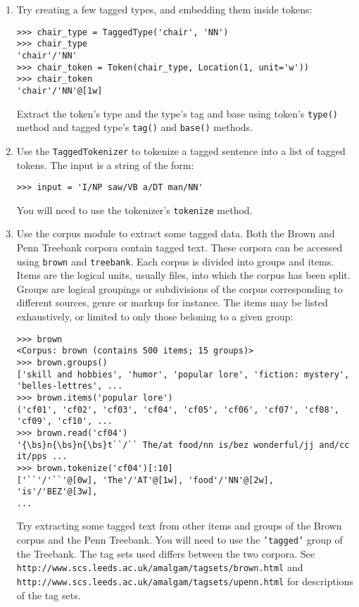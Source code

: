 \documentclass{worksheet}
\begin{document}
\begin{enumerate}
\item Try creating a few tagged types, and embedding them inside tokens:
\begin{verbatim}
>>> chair_type = TaggedType('chair', 'NN') 
>>> chair_type 
'chair'/'NN' 
>>> chair_token = Token(chair_type, Location(1, unit='w')) 
>>> chair_token 
'chair'/'NN'@[1w]
\end{verbatim}
Extract the token's type and the type's tag and base using token's 
\texttt{type()} method and tagged type's \texttt{tag()} and
\texttt{base()} methods.


\item Use the \texttt{TaggedTokenizer} to tokenize a tagged sentence into a
list of tagged tokens. The input is a string of the form:
\begin{verbatim}
>>> input = 'I/NP saw/VB a/DT man/NN'
\end{verbatim}
You will need to use the tokenizer's \texttt{tokenize} method.


\item Use the corpus module to extract some tagged data. Both the Brown and
Penn Treebank corpora contain tagged text. These corpora can be accessed
using \texttt{brown} and \texttt{treebank}. Each corpus is divided into
groups and items. Items are the logical units, usually files, into which
the corpus has been split. Groups are logical groupings or subdivisions of
the corpus corresponding to different sources, genre or markup for
instance. The items may be listed exhaustively, or limited to only those
beloning to a given group:
\begin{verbatim}
>>> brown 
<Corpus: brown (contains 500 items; 15 groups)> 
>>> brown.groups() 
['skill and hobbies', 'humor', 'popular lore', 'fiction: mystery',
'belles-lettres', ... 
>>> brown.items('popular lore') 
('cf01', 'cf02', 'cf03', 'cf04', 'cf05', 'cf06', 'cf07', 'cf08',
'cf09', 'cf10', ... 
>>> brown.read('cf04') 
'{\bs}n{\bs}n{\bs}t``/`` The/at food/nn is/bez wonderful/jj and/cc
it/pps ... 
>>> brown.tokenize('cf04')[:10] 
['``'/'``'@[0w], 'The'/'AT'@[1w], 'food'/'NN'@[2w], 'is'/'BEZ'@[3w],
...
\end{verbatim}
Try extracting some tagged text from other items and groups of the Brown
corpus and the Penn Treebank. You will need to use the \texttt{'tagged'}
group of the Treebank. The tag sets used differs between the two
corpora. See
\texttt{http://www.scs.leeds.ac.uk/amalgam/tagsets/brown.html} and
\texttt{http://www.scs.leeds.ac.uk/amalgam/tagsets/upenn.html} for
descriptions of the tag sets.



\end{enumerate}
\end{document}

